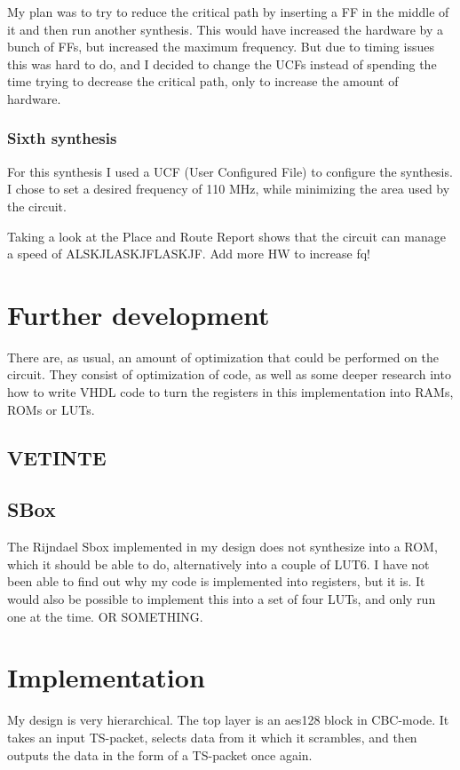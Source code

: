 My plan was to try to reduce the critical path by inserting a FF in the 
middle of it and then run another synthesis. This would have increased the 
hardware by a bunch of FFs, but increased the maximum frequency. But due 
to timing issues this was hard to do, and I decided to change the UCFs 
instead of spending the time trying to decrease the critical path, only to 
increase the amount of hardware.

\subsubsection{Sixth synthesis}
For this synthesis I used a UCF (User Configured File) to configure the synthesis. 
I chose to set a desired frequency of 110 MHz, while minimizing the area used by 
the circuit.

Taking a look at the Place and Route Report shows that the circuit can manage a 
speed of ALSKJLASKJFLASKJF. Add more HW to increase fq!

\section{Further development}
There are, as usual, an amount of optimization that could be performed 
on the circuit. They consist of optimization of code, as well as some 
deeper research into how to write VHDL code to turn the registers in 
this implementation into RAMs, ROMs or LUTs.

\subsection{VETINTE}

\subsection{SBox}
The Rijndael Sbox implemented in my design does not synthesize into a 
ROM, which it should be able to do, alternatively into a couple of LUT6.
I have not been able to find out why my code is implemented into 
registers, but it is. 
It would also be possible to implement this into a set of four LUTs, 
and only run one at the time. OR SOMETHING.

\section{Implementation}
My design is very hierarchical. The top layer is an aes128 block in 
CBC-mode. It takes an input TS-packet, selects data from it which it 
scrambles, and then outputs the data in the form of a TS-packet once 
again.


